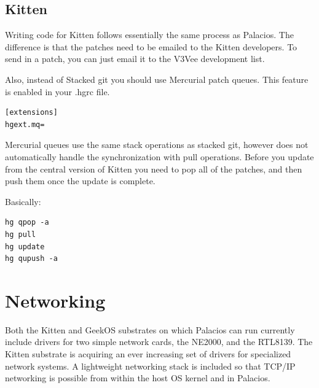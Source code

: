 \documentclass[11pt]{article}
\begin{document}
\subsection{Kitten}

Writing code for Kitten follows essentially the same process as
Palacios. The difference is that the patches need to be emailed to the
Kitten developers. To send in a patch, you can just email it to the
V3Vee development list.


Also, instead of Stacked git you should use Mercurial patch
queues. This feature is enabled in your .hgrc file.
\begin{verbatim}
[extensions]
hgext.mq=
\end{verbatim}

Mercurial queues use the same stack operations as stacked git, however
does not automatically handle the synchronization with pull
operations. Before you update from the central version of Kitten you
need to pop all of the patches, and then push them once the update is
complete.

Basically:
\begin{verbatim}
hg qpop -a
hg pull
hg update
hg qupush -a
\end{verbatim}




\section{Networking}

Both the Kitten and GeekOS substrates on which Palacios can run
currently include drivers for two simple network cards, the NE2000,
and the RTL8139.  The Kitten substrate is acquiring an ever increasing
set of drivers for specialized network systems.   A lightweight
networking stack is included so that TCP/IP networking is possible
from within the host OS kernel and in Palacios.  
\end{document}
